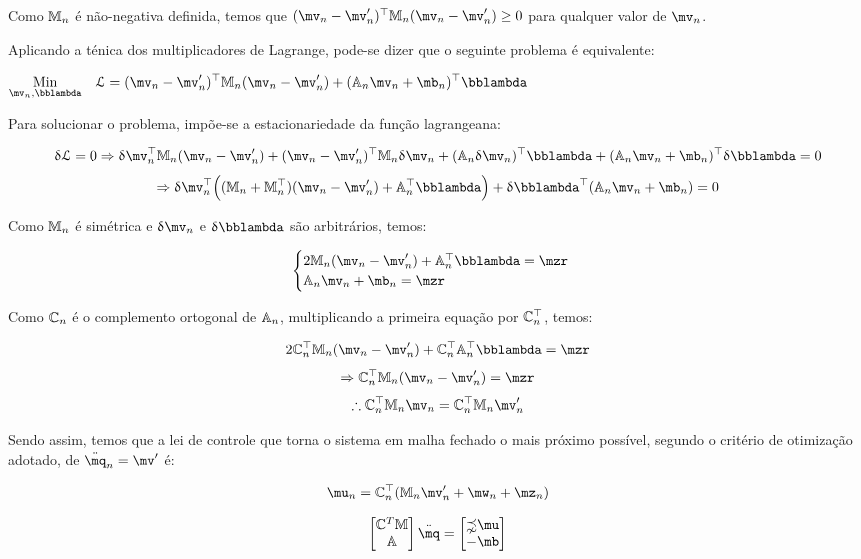 Como $\mathbb{M}_n$ \'e n\~ao-negativa definida, temos que $(\mv_n - \mv'_n)^\top \mM_n (\mv_n - \mv'_n) \geq 0 $ para qualquer valor de $\mv_n$.

Aplicando a ténica dos multiplicadores de Lagrange, pode-se dizer que o seguinte problema é equivalente:

\begin{center}
$\begin{aligned}
& \underset{\mv_n, \mlambda}{\text{Min}}
& & \llL = (\mv_n - \mv'_n)^\top \mM_n (\mv_n - \mv'_n) + (\mA_n \mv_n + \mb_n)^\top \mlambda \\
\end{aligned}$
\end{center}

Para solucionar o problema, impõe-se a estacionariedade da função lagrangeana:

$$ \dl \llL = 0 \Rightarrow \dl \mv_n^\top \mM_n (\mv_n - \mv'_n) + (\mv_n - \mv'_n)^\top \mM_n \dl \mv_n + (\mA_n \dl \mv_n)^\top \mlambda + (\mA_n \mv_n + \mb_n)^\top \dl \mlambda = 0 $$
$$ \Rightarrow \dl \mv_n^\top \Big( (\mM_n + \mM_n^\top)(\mv_n - \mv'_n) + \mA_n^\top \mlambda \Big) + \dl \mlambda^\top (\mA_n \mv_n + \mb_n) = 0 $$

Como $\mathbb{M}_n$ é simétrica e $\dl \mv_n$ e $\dl \mlambda$ são arbitr\'arios, temos:

$$
\begin{cases}
2 \mM_n (\mv_n - \mv'_n) + \mA_n^\top \mlambda = \mzr \\
\mA_n \mv_n + \mb_n = \mzr
\end{cases}
$$

Como $\mathbb{C}_n$ é o complemento ortogonal de $\mathbb{A}_n$, multiplicando a primeira equação por $\mathbb{C}_n^\top$, temos:

$$ 2 \mC_n^\top \mM_n (\mv_n - \mv'_n) + \mC_n^\top \mA_n^\top \mlambda = \mzr $$
$$ \Rightarrow  \mC_n^\top \mM_n (\mv_n - \mv'_n)  = \mzr $$
$$ \therefore \mC_n^\top \mM_n \mv_n  = \mC_n^\top \mM_n  \mv'_n $$

Sendo assim, temos que a lei de controle que torna o sistema em malha fechado o mais pr\'oximo poss\'ivel, segundo o crit\'erio de otimiza\c{c}\~ao adotado, de $\ddot{\mq}_n = \mv'$ \'e:

$$ \mu_n = \mC_n^\top ( \mM_n \mv'_n + \mw_n + \mz_n ) $$

\newpage



$$
\begin{bmatrix}
\mC^T \mM \\
\mA
\end{bmatrix}
\ddot{\mq}
=
\begin{bmatrix}
\mathbb{\zeta} \mu \\
-\mb
\end{bmatrix}
$$



